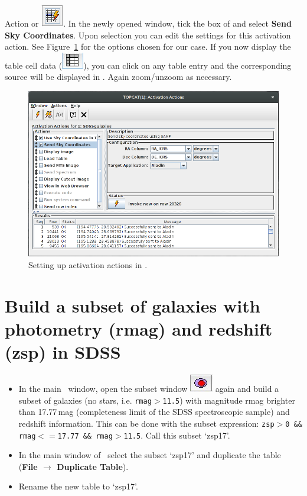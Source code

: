 \documentclass [a4paper, 12pt]{article}
\begin{document}
\begin{itemize}
\begin{itemize}
{    Action} or \includegraphics[width=0.035
    \textwidth]{../images/topcat_button_activationaction.png}. In the newly
    opened window, tick the box of and select \textbf{Send Sky Coordinates}.
    Upon selection you can edit the settings for this activation action. See
    Figure~\ref{fig:topcat_activation} for the options chosen for our case. If
    you now display the table cell data (\includegraphics[width=0.035
    \textwidth]{../images/topcat_button_open-tab.jpg}), you can click on any
    table entry
    and the corresponding source will be displayed in \aladin. Again
    zoom/unzoom as necessary.
\end{itemize}
\end{itemize}

\begin{figure}[H]
     \center
     \includegraphics[width=0.6
     \textwidth]{../images/topcat_window_activationaction.png}
     \caption{Setting up activation actions in \topcat.}
     \label{fig:topcat_activation}
\end{figure}

\section{Build a subset of galaxies with photometry (rmag) and redshift (zsp)
in SDSS}

\begin{itemize}
\item In the main \topcat\ window, open the subset window
\includegraphics[width=0.04  \textwidth]{../images/topcat_button_subset.jpg}
again and
build a subset of galaxies (no stars, i.e. \texttt{rmag$>$11.5}) with magnitude
rmag brighter than 17.77\,mag (completeness limit of the SDSS spectroscopic
sample) and redshift information. This can be done with the subset expression:
\texttt{zsp$>$0 \&\& rmag$<=$17.77 \&\& rmag$>$11.5}. Call this subset `zsp17'.
\item In the main window of \topcat\ select the subset `zsp17' and duplicate the table (\textbf{File $\rightarrow$ Duplicate Table}).
\item Rename the new table to `zsp17'.
\end{itemize}
\end{document}
